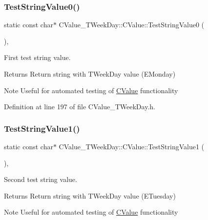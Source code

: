 \subsubsection{\texorpdfstring{Test\+String\+Value0()}{TestStringValue0()}}
{\footnotesize\ttfamily static const char$\ast$ C\+Value\+\_\+\+T\+Week\+Day\+::\+C\+Value\+::\+Test\+String\+Value0 (\begin{DoxyParamCaption}{ }\end{DoxyParamCaption})\hspace{0.3cm}{\ttfamily [inline]}, {\ttfamily [static]}}



First test string value. 

\begin{DoxyReturn}{Returns}
Return string with T\+Week\+Day value (E\+Monday) 
\end{DoxyReturn}
\begin{DoxyNote}{Note}
Useful for automated testing of \hyperlink{class_c_value___t_week_day_1_1_c_value}{C\+Value} functionality 
\end{DoxyNote}


Definition at line 197 of file C\+Value\+\_\+\+T\+Week\+Day.\+h.

\mbox{\label{class_c_value___t_week_day_1_1_c_value_a333999118ee2a849c35d2aa9aa6bc828}} 
\subsubsection{\texorpdfstring{Test\+String\+Value1()}{TestStringValue1()}}
{\footnotesize\ttfamily static const char$\ast$ C\+Value\+\_\+\+T\+Week\+Day\+::\+C\+Value\+::\+Test\+String\+Value1 (\begin{DoxyParamCaption}{ }\end{DoxyParamCaption})\hspace{0.3cm}{\ttfamily [inline]}, {\ttfamily [static]}}



Second test string value. 

\begin{DoxyReturn}{Returns}
Return string with T\+Week\+Day value (E\+Tuesday) 
\end{DoxyReturn}
\begin{DoxyNote}{Note}
Useful for automated testing of \hyperlink{class_c_value___t_week_day_1_1_c_value}{C\+Value} functionality 
\end{DoxyNote}


